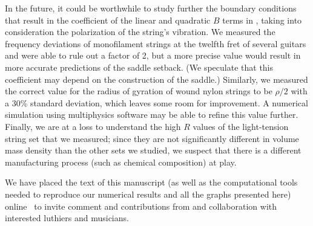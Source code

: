 In the future, it could be worthwhile to study further the boundary conditions that result in the coefficient of the linear and quadratic $B$ terms in , taking into consideration the polarization of the string's vibration. We measured the frequency deviations of monofilament strings at the twelfth fret of several guitars and were able to rule out a factor of 2, but a more precise value would result in more accurate predictions of the saddle setback. (We speculate that this coefficient may depend on the construction of the saddle.) Similarly, we measured the correct value for the radius of gyration of wound nylon strings to be $\rho/2$ with a 30\% standard deviation, which leaves some room for improvement. A numerical simulation using multiphysics software may be able to refine this value further. Finally, we are at a loss to understand the high $R$ values of the light-tension string set that we measured; since they are not significantly different in volume mass density than the other sets we studied, we suspect that there is a different manufacturing process (such as chemical composition) at play.

We have placed the text of this manuscript (as well as the computational tools needed to reproduce our numerical results and all the graphs presented here) online~\cite{ref:github2024rgb} to invite comment and contributions from and collaboration with interested luthiers and musicians.